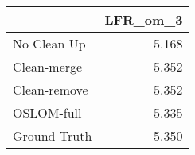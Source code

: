 \begin{tabular}{lr}
\toprule
{} & LFR_om_3 \\
\midrule
No Clean Up  &    5.168 \\
Clean-merge  &    5.352 \\
Clean-remove &    5.352 \\
OSLOM-full   &    5.335 \\
Ground Truth &    5.350 \\
\bottomrule
\end{tabular}
